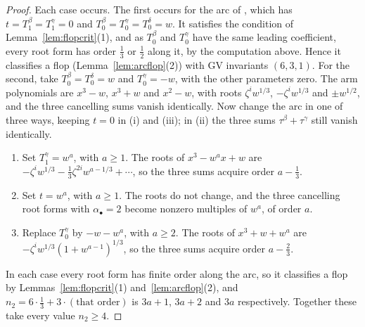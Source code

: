 \documentclass[11pt]{amsart}
\numberwithin{table}{section}
\numberwithin{figure}{section}
\numberwithin{equation}{section}
\theoremstyle{definition}
\theoremstyle{plain}
\newcommand{\bul}{\bullet}
\begin{document}
\begin{proof}
Each case occurs. The first occurs for the arc of \cite[Example~5.3]{K}, which has $t = T_1^\beta = T_1^\gamma = 0$ and $T_0^\beta = T_0^\gamma = T_0^\delta = w$. It satisfies the condition of Lemma~\ref{lem:flopcrit}(1), and as $T_0^\beta$ and $T_0^\gamma$ have the same leading coefficient, every root form has order $\frac13$ or $\frac12$ along it, by the computation above. Hence it classifies a flop (Lemma~\ref{lem:arcflop}(2)) with GV invariants $(6, 3, 1)$. For the second, take $T_0^\beta = T_0^\delta = w$ and $T_0^\gamma = -w$, with the other parameters zero. The arm polynomials are $x^3 - w$, $x^3 + w$ and $x^2 - w$, with roots $\zeta^i w^{1/3}$, $-\zeta^i w^{1/3}$ and $\pm w^{1/2}$, and the three cancelling sums vanish identically. Now change the arc in one of three ways, keeping $t = 0$ in (i) and (iii); in (ii) the three sums $\tau^\beta + \tau^\gamma$ still vanish identically.
\begin{enumerate}[label=(\roman*)]
\item Set $T_1^\gamma = w^a$, with $a \ge 1$. The roots of $x^3 - w^a x + w$ are $-\zeta^i w^{1/3} - \frac13\zeta^{2i} w^{a - 1/3} + \cdots$, so the three sums acquire order $a - \frac13$.
\item Set $t = w^a$, with $a \ge 1$. The roots do not change, and the three cancelling root forms with $\alpha_\bul = 2$ become nonzero multiples of $w^a$, of order $a$.
\item Replace $T_0^\gamma$ by $-w - w^a$, with $a \ge 2$. The roots of $x^3 + w + w^a$ are $-\zeta^i w^{1/3}(1 + w^{a-1})^{1/3}$, so the three sums acquire order $a - \frac23$.
\end{enumerate}
In each case every root form has finite order along the arc, so it classifies a flop by Lemmas~\ref{lem:flopcrit}(1) and~\ref{lem:arcflop}(2), and $n_2 = 6\cdot\frac13 + 3\cdot(\text{that order})$ is $3a + 1$, $3a + 2$ and $3a$ respectively. Together these take every value $n_2 \ge 4$.
\end{proof}
\end{document}
